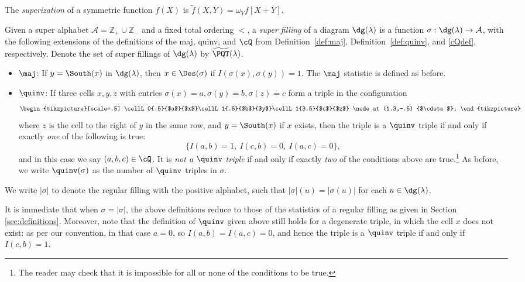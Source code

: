  
\begin{defn}
The \emph{superization} of a symmetric function $f(X)$ is $\widetilde{f}(X,Y) = \omega_Y f[X+Y]$.
\end{defn}

\begin{defn}\label{def:super}
Given a super alphabet $\mathcal{A} = \mathbb{Z}_+ \cup \mathbb{Z}_-$ and a fixed total ordering $<$, a \emph{super filling} of a diagram $\dg(\lambda)$ is a function $\sigma: \dg(\lambda) \rightarrow \mathcal{A}$, with the following extensions of the
definitions of the maj, quinv, and $\cQ$ from Definition~\ref{def:maj}, Definition~\ref{def:quinv}, and \eqref{cQdef}, respectively. 
Denote the set of super fillings of $\dg(\lambda)$ by $\widetilde{\PQT}(\lambda)$.
\begin{itemize}[leftmargin=10pt]
\item $\maj$: If $y = \South(x)$ in $\dg(\lambda)$, then $x \in\Des(\sigma)$ if $I(\sigma(x),\sigma(y))=1$. The $\maj$ statistic is defined as before.

\item $\quinv$: If three cells $x,y,z$ with entries $\sigma(x)=a,\sigma(y)=b,\sigma(z)=c$ form a triple in the configuration 
\[
\begin{tikzpicture}[scale=.5]
\cellL0{.5}{$a$}{$x$}\cellL1{.5}{$b$}{$y$}\cellL1{3.5}{$c$}{$z$}
\node at (1.3,-.5) {$\cdots$};
\end{tikzpicture}
\] 
where $z$ is the cell to the right of $y$ in the same row, and $y=\South(x)$ if $x$ exists, then the triple is a $\quinv$ triple if and only if exactly \emph{one} of the following is true:
\[
\{I(a,b)=1,\ I(c,b)=0,\ I(a,c)=0\},
\] 
and in this case we say $(a,b,c)\in\cQ$. It is \emph{not a $\quinv$ triple} if and only if exactly \emph{two} of the conditions above are true.\footnote{The reader may check that it is impossible for all or none of the conditions to be true.} 
As before, we write $\quinv(\sigma)$ as the number of $\quinv$ triples in $\sigma$.
\end{itemize}
We write $|\sigma|$ to denote the regular filling with the positive alphabet, such that $|\sigma|(u)= |\sigma(u)|$ for each $u\in \dg(\lambda)$. 
\end{defn}

It is immediate that when $\sigma=|\sigma|$, the above definitions reduce to those of the statistics of a regular filling as given in Section \ref{sec:definitions}. Moreover, note that the definition of $\quinv$ given above still holds for a degenerate triple, in which the cell $x$ does not exist: as per our convention, in that case $a=0$, so $I(a,b)=I(a,c)=0$, and hence the triple is a $\quinv$ triple if and only if $I(c,b)=1$.  

